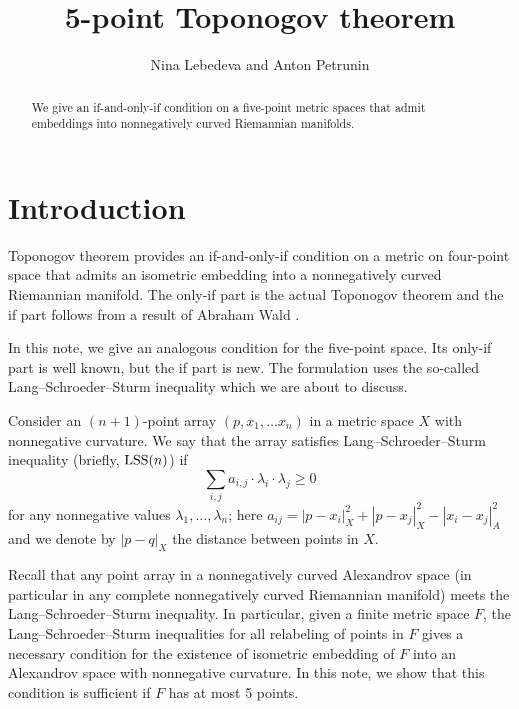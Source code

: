 \documentclass{article}
\begin{document}


\title{5-point Toponogov theorem}
\author{Nina Lebedeva and Anton Petrunin}

\date{}
\maketitle
\begin{abstract}
We give an if-and-only-if condition on a five-point metric spaces that admit embeddings into nonnegatively curved Riemannian manifolds.
\end{abstract}


\section{Introduction}

Toponogov theorem provides an if-and-only-if condition on a metric on four-point space that admits an isometric embedding into a nonnegatively curved Riemannian manifold.
The only-if part is the actual Toponogov theorem and the if part follows from a result of Abraham Wald \cite[\S 7]{wald}.

In this note, we give an analogous condition for the five-point space.
Its only-if part is well known, but the if part is new.
The formulation uses the so-called Lang--Schroeder--Sturm inequality \cite{lang-schroeder, sturm} which we are about to discuss.

Consider an $(n+1)$-point array $(p,x_1,\dots x_n)$ in a metric space $X$ with nonnegative curvature.
We say that the array satisfies Lang--Schroeder--Sturm inequality (briefly,  $\mathrm{LSS}(n)$)
if 
\[\sum_{i,j}a_{i,j}\cdot \lambda_i\cdot\lambda_j\ge 0\]
for any nonnegative values $\lambda_1,\dots,\lambda_n$;
here $a_{ij}=|p-x_i|_X^2+|p-x_j|_X^2-|x_i-x_j|_A^2$
and we denote by $|p-q|_X$ the distance between points in $X$.

Recall that any point array in a nonnegatively curved Alexandrov space (in particular in any complete nonnegatively curved Riemannian manifold) meets the Lang--Schroeder--Sturm inequality.
In particular, 
given a finite metric space $F$, the
Lang--Schroeder--Sturm inequalities for all relabeling of points in $F$
gives a necessary condition for the existence of isometric embedding of $F$ into an Alexandrov space with nonnegative curvature.
In this note, we show that this condition is sufficient if $F$ has at most 5 points.
\end{document}

